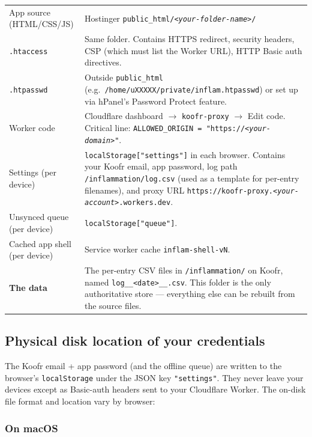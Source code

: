 \documentclass[11pt,a4paper]{article}
\begin{document}
\begin{center}
\small
\renewcommand{\arraystretch}{1.3}
\begin{tabularx}{\linewidth}{lX}
App source (HTML/CSS/JS) & Hostinger \texttt{public\_html/\textit{\color{red!70!black}<your-folder-name>}/} \\
\texttt{.htaccess} & Same folder. Contains HTTPS redirect, security headers, CSP (which must list the Worker URL), HTTP Basic auth directives. \\
\texttt{.htpasswd} & Outside \texttt{public\_html} (e.g.\ \texttt{/home/uXXXXX/private/inflam.htpasswd}) or set up via hPanel's Password Protect feature. \\
Worker code & Cloudflare dashboard $\rightarrow$ \texttt{koofr-proxy} $\rightarrow$ Edit code. Critical line: \texttt{ALLOWED\_ORIGIN = "https://\textit{\color{red!70!black}<your-domain>}"}. \\
Settings (per device) & \texttt{localStorage["settings"]} in each browser. Contains your Koofr email, app password, log path \texttt{/inflammation/log.csv} (used as a template for per-entry filenames), and proxy URL \texttt{https://koofr-proxy.\textit{\color{red!70!black}<your-account>}.workers.dev}. \\
Unsynced queue (per device) & \texttt{localStorage["queue"]}. \\
Cached app shell (per device) & Service worker cache \texttt{inflam-shell-vN}. \\
\textbf{The data} & The per-entry CSV files in \texttt{/inflammation/} on Koofr, named \texttt{log\_\_<date>\_\_<write-ms>.csv}. This folder is the only authoritative store --- everything else can be rebuilt from the source files. \\
\end{tabularx}
\end{center}

\subsection{Physical disk location of your credentials}

The Koofr email + app password (and the offline queue) are written to the browser's \texttt{localStorage} under the JSON key \texttt{"settings"}. They never leave your devices except as Basic-auth headers sent to your Cloudflare Worker. The on-disk file format and location vary by browser:

\subsubsection*{On macOS}
\end{document}
